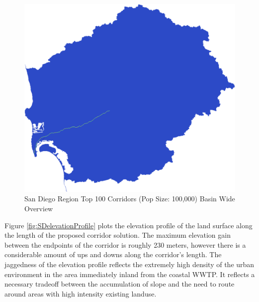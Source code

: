         \begin{figure}[!h]
            \begin{center}
            \includegraphics[width=5.5in]{figures/SanDiego_PathwayLarge.png}   
            \caption{San Diego Region Top 100 Corridors (Pop Size: 100,000) Basin Wide Overview}
            \label{fig:SDsolutionOverview}
            \end{center}
        \end{figure}
        
Figure \ref{fig:SDelevationProfile} plots the elevation profile of the land surface along the length of the proposed corridor solution. The maximum elevation gain between the endpoints of the corridor is roughly 230 meters, however there is a considerable amount of ups and downs along the corridor's length. The jaggedness of the elevation profile reflects the extremely high density of the urban environment in the area immediately inland from the coastal WWTP. It reflects a necessary tradeoff between the accumulation of slope and the need to route around areas with high intensity existing landuse. 
        
